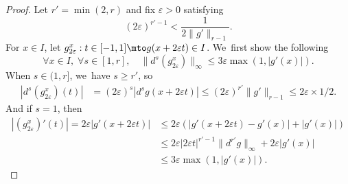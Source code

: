 \begin{proof}
Let $r' = \min(2,r)$ and fix $\varepsilon > 0$ satisfying
\[
(2 \varepsilon)^{r'-1} < \frac{1}{2 \| g' \|_{r - 1}}.
\]
For $x \in I$, let $g_{2 \varepsilon}^x : t \in [-1, 1] \mto g(x + 2 \varepsilon t) \in I$. We~first show the following
\[
\forall x \in I,\; \forall s \in [1, r],\quad \| d^s \left (g_{2 \varepsilon}^x \right) \|_{\infty} \leq 3 \varepsilon \max \left (1, | g'(x)| \right).
\]
When $s \in (1, r]$, we~have $s \geq r'$, so
\begin{align*}
| d^s \left (g_{2 \varepsilon}^x \right) (t) | &= (2 \varepsilon)^s | d^s g (x + 2 \varepsilon t)|\leq (2 \varepsilon)^{r'} \| g' \|_{r-1}\leq 2\varepsilon \times 1/2.
\end{align*}
And if $s=1$, then
\begin{align*}
| \left (g_{2 \varepsilon}^x \right)' (t) | = 2 \varepsilon |g'(x + 2 \varepsilon t)|
&\leq 2 \varepsilon \left (|g'(x + 2 \varepsilon t) - g'(x)| + |g'(x)| \right)\\
&\leq 2 \varepsilon | 2 \varepsilon t |^{r'-1} \| d^{r'} g\|_{\infty} + 2 \varepsilon |g'(x)|\\
&\leq 3 \varepsilon \max (1, |g'(x)|).
\end{align*}


\end{proof}

